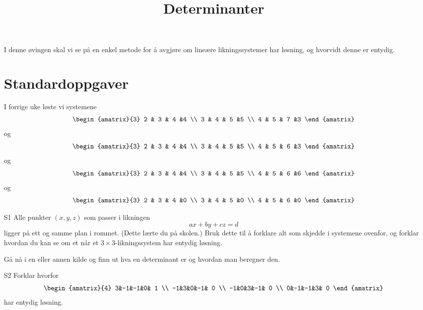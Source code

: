 



\title{Determinanter}




\maketitle


I denne øvingen skal vi se på en enkel metode for å avgjøre om lineære likningssystemer har løsning, 
og hvorvidt denne er entydig. 

\section*{Standardoppgaver}


I forrige uke løste vi systemene
\[
\begin{amatrix}{3}
2 & 3 & 4 &4 \\
3 & 4 & 5 &5 \\
4 & 5 & 7 &3
\end{amatrix}
\]
og
\[
\begin{amatrix}{3}
2 & 3 & 4 &4 \\
3 & 4 & 5 &5 \\
4 & 5 & 6 &3
\end{amatrix}
\]
og
\[
\begin{amatrix}{3}
2 & 3 & 4 &4 \\
3 & 4 & 5 &5 \\
4 & 5 & 6 &6
\end{amatrix}
\]
og
\[
\begin{amatrix}{3}
2 & 3 & 4 &0 \\
3 & 4 & 5 &0 \\
4 & 5 & 6 &0
\end{amatrix}
\]

\begin{oppgave}{S1}
Alle punkter $(x,y,z)$ som passer i likningen 
\[
ax+by+cz=d
\]
ligger på ett og samme plan i rommet. 
(Dette lærte du på skolen.)
Bruk dette til å forklare alt som skjedde i systemene ovenfor,
og forklar hvordan du kan se om et når et $3\times 3$-likningssystem har entydig løsning.
\end{oppgave}

Gå nå i en eller annen kilde og finn ut hva en determinant er og hvordan man beregner den.

\begin{oppgave}{S2}
Forklar hvorfor
\[
\begin{amatrix}{4}
3&-1&-1&0& 1 \\
-1&3&0&-1& 0 \\
-1&0&3&-1& 0 \\
0&-1&-1&3& 0 
\end{amatrix}
\]
har entydig løsning.
\end{oppgave}

